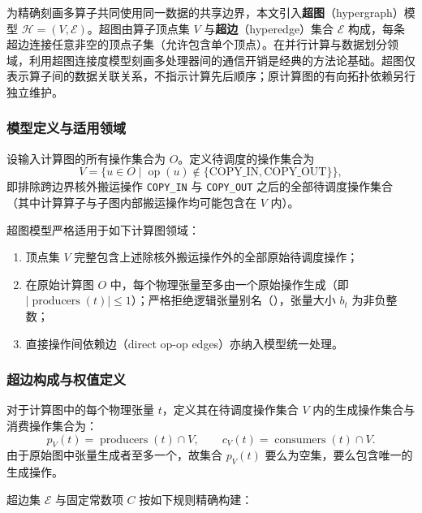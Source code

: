 \documentclass[anonymous,notoc]{gmcm2026}
\providecommand{\tightlist}{\setlength{\itemsep}{0pt}\setlength{\parskip}{0pt}}
\begin{document}
为精确刻画多算子共同使用同一数据的共享边界，本文引入\textbf{超图}（hypergraph）模型 \(\mathcal{H} = (V, \mathcal{E})\)。超图由算子顶点集 \(V\) 与\textbf{超边}（hyperedge）集合 \(\mathcal{E}\) 构成，每条超边连接任意非空的顶点子集（允许包含单个顶点）\cite{ref5}。在并行计算与数据划分领域，利用超图连接度模型刻画多处理器间的通信开销是经典的方法论基础\cite{ref3}。超图仅表示算子间的数据关联关系，不指示计算先后顺序；原计算图的有向拓扑依赖另行独立维护。

\subsubsection{模型定义与适用领域}

设输入计算图的所有操作集合为 \(O\)。定义待调度的操作集合为 \begin{equation}
V = \{u \in O \mid \operatorname{op}(u) \notin \{\text{COPY\_IN}, \text{COPY\_OUT}\}\},
\end{equation} 即排除跨边界核外搬运操作 \texttt{COPY\_IN} 与 \texttt{COPY\_OUT} 之后的全部待调度操作集合（其中计算算子与子图内部搬运操作均可能包含在 \(V\) 内）。

超图模型严格适用于如下计算图领域：

\begin{enumerate}
\def\labelenumi{\arabic{enumi}.}
\tightlist
\item
  顶点集 \(V\) 完整包含上述除核外搬运操作外的全部原始待调度操作；
\item
  在原始计算图 \(O\) 中，每个物理张量至多由一个原始操作生成（即 \(|\operatorname{producers}(t)| \le 1\)）；严格拒绝逻辑张量别名（\texttt{}），张量大小 \(b_t\) 为非负整数；
\item
  直接操作间依赖边（direct op-op edges）亦纳入模型统一处理。
\end{enumerate}

\subsubsection{超边构成与权值定义}

对于计算图中的每个物理张量 \(t\)，定义其在待调度操作集合 \(V\) 内的生成操作集合与消费操作集合为： \begin{equation}
p_V(t) = \operatorname{producers}(t) \cap V, \qquad c_V(t) = \operatorname{consumers}(t) \cap V.
\end{equation} 由于原始图中张量生成者至多一个，故集合 \(p_V(t)\) 要么为空集，要么包含唯一的生成操作。

超边集 \(\mathcal{E}\) 与固定常数项 \(C\) 按如下规则精确构建：
\end{document}
